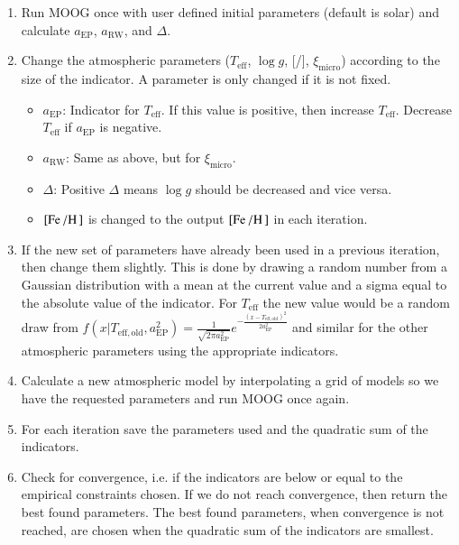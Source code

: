 \documentclass{aa}
\begin{document}
\begin{enumerate}
    \item Run MOOG once with user defined initial parameters (default is
          solar) and calculate $a_\mathrm{EP}$, $a_\mathrm{RW}$, and
          $\Delta$.
    \item Change the atmospheric parameters ($T_\mathrm{eff}$, $\log g$,
          [/], $\xi_\mathrm{micro}$) according to the size of the
          indicator. A parameter is only changed if it is not fixed.
    \begin{itemize}
        \item $a_\mathrm{EP}$: Indicator for $T_\mathrm{eff}$. If this value
              is positive, then increase $T_\mathrm{eff}$. Decrease
              $T_\mathrm{eff}$ if $a_\mathrm{EP}$ is negative.
        \item $a_\mathrm{RW}$: Same as above, but for $\xi_\mathrm{micro}$.
        \item $\Delta$: Positive $\Delta$ means $\log g$
              should be decreased and vice versa.
        \item $[\ion{Fe}{}/\ion{H}{}]$ is changed to the output
              $[\ion{Fe}{}/\ion{H}{}]$ in each iteration.
    \end{itemize}
    \item If the new set of parameters have already been used in a previous
          iteration, then change them slightly. This is done by drawing a random
          number from a Gaussian distribution with a mean at the current value
          and a sigma equal to the absolute value of the indicator. For
          $T_\mathrm{eff}$ the new value would be a random draw from
          $f(x|T_\mathrm{eff,old},a_\mathrm{EP}^2) = \frac{1}{\sqrt{2\pi a_\mathrm{EP}^2 }}e^{-\frac{(x - T_\mathrm{eff,old})^2 } {2 a_\mathrm{EP}^2} }$
          and similar for the other atmospheric parameters using the appropriate
          indicators.
    \item Calculate a new atmospheric model by interpolating a grid of models
          so we have the requested parameters and run MOOG once again.
    \item For each iteration save the parameters used and the quadratic sum of
          the indicators.
    \item Check for convergence, i.e. if the indicators are below or equal
          to the empirical constraints chosen. If we do not reach convergence,
          then return the best found parameters. The best found parameters,
          when convergence is not reached, are chosen when the quadratic sum
          of the indicators are smallest.
\end{enumerate}
\end{document}
